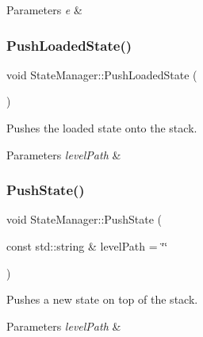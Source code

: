 \begin{DoxyParams}{Parameters}
{\em e} & \\
\hline
\end{DoxyParams}
\mbox{\label{classStateManager_ae296599b6c4332317d9ce844f5e3bad4}} 
\subsubsection{\texorpdfstring{Push\+Loaded\+State()}{PushLoadedState()}}
{\footnotesize\ttfamily void State\+Manager\+::\+Push\+Loaded\+State (\begin{DoxyParamCaption}{ }\end{DoxyParamCaption})}



Pushes the loaded state onto the stack. 


\begin{DoxyParams}{Parameters}
{\em level\+Path} & \\
\hline
\end{DoxyParams}
\mbox{\label{classStateManager_a608027305a6a97bdbc958c7e68fcb5bc}} 
\subsubsection{\texorpdfstring{Push\+State()}{PushState()}}
{\footnotesize\ttfamily void State\+Manager\+::\+Push\+State (\begin{DoxyParamCaption}\item[{const std\+::string \&}]{level\+Path = {\ttfamily \char`\"{}\char`\"{}} }\end{DoxyParamCaption})}



Pushes a new state on top of the stack. 


\begin{DoxyParams}{Parameters}
{\em level\+Path} & \\
\hline
\end{DoxyParams}
\mbox{\label{classStateManager_aca3d023f833f9b85b28668e3d3acd2d3}} 
